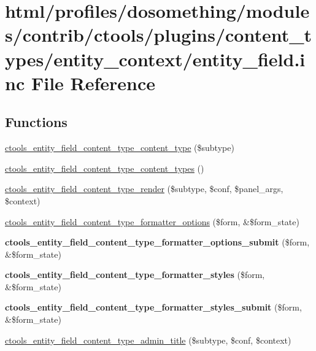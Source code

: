 \hypertarget{entity__field_8inc}{
\section{html/profiles/dosomething/modules/contrib/ctools/plugins/content\_\-types/entity\_\-context/entity\_\-field.inc File Reference}
\label{entity__field_8inc}
}
\subsection*{Functions}
\begin{DoxyCompactItemize}
\item 
\hyperlink{entity__field_8inc_a6502bcfaf5df20ed5417c11358270e23}{ctools\_\-entity\_\-field\_\-content\_\-type\_\-content\_\-type} (\$subtype)
\item 
\hyperlink{entity__field_8inc_a785e767ce2c1805d7d1fb662548e42bd}{ctools\_\-entity\_\-field\_\-content\_\-type\_\-content\_\-types} ()
\item 
\hyperlink{entity__field_8inc_a33ebb34ff4cd42a079450e025e3eaf18}{ctools\_\-entity\_\-field\_\-content\_\-type\_\-render} (\$subtype, \$conf, \$panel\_\-args, \$context)
\item 
\hyperlink{entity__field_8inc_a63949a8688796a644b579777c3be743b}{ctools\_\-entity\_\-field\_\-content\_\-type\_\-formatter\_\-options} (\$form, \&\$form\_\-state)
\item 
\hypertarget{entity__field_8inc_a72a0906e9c27cd72ca5be8b81595c5a0}{
{\bfseries ctools\_\-entity\_\-field\_\-content\_\-type\_\-formatter\_\-options\_\-submit} (\$form, \&\$form\_\-state)}
\label{entity__field_8inc_a72a0906e9c27cd72ca5be8b81595c5a0}

\item 
\hypertarget{entity__field_8inc_a285cf8aec53f92dce099a2f54cb78ee1}{
{\bfseries ctools\_\-entity\_\-field\_\-content\_\-type\_\-formatter\_\-styles} (\$form, \&\$form\_\-state)}
\label{entity__field_8inc_a285cf8aec53f92dce099a2f54cb78ee1}

\item 
\hypertarget{entity__field_8inc_a578eba7eb5b98b73d3ab2b5241d70f61}{
{\bfseries ctools\_\-entity\_\-field\_\-content\_\-type\_\-formatter\_\-styles\_\-submit} (\$form, \&\$form\_\-state)}
\label{entity__field_8inc_a578eba7eb5b98b73d3ab2b5241d70f61}

\item 
\hyperlink{entity__field_8inc_ae45b46517ede385c0ea11c59f0ea2e6b}{ctools\_\-entity\_\-field\_\-content\_\-type\_\-admin\_\-title} (\$subtype, \$conf, \$context)
\end{DoxyCompactItemize}
